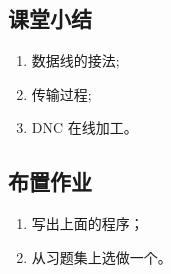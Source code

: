 \newpage
\subsection{课堂小结}
\begin{enumerate}[1、]
	\item 数据线的接法;
	\item 传输过程;
	\item DNC 在线加工。
\end{enumerate}

\vfill
\subsection{布置作业}
\begin{enumerate}[1、]
	\item 写出上面的程序；
	\item 从习题集上选做一个。
\end{enumerate}
\vfill